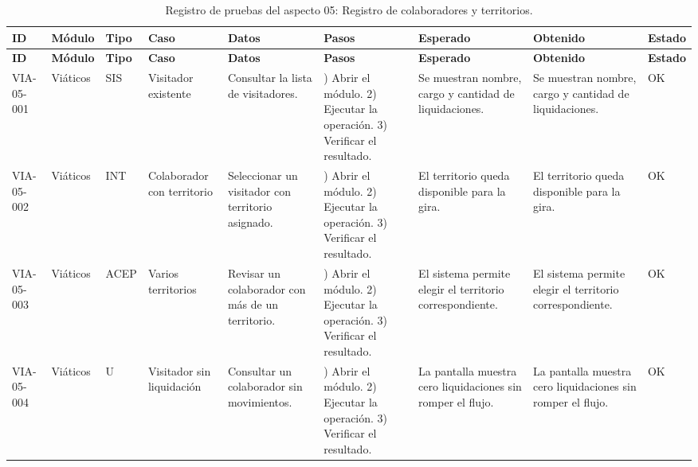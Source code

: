\begingroup\fontsize{8}{10}\selectfont\renewcommand{\arraystretch}{1.25}\setlength{\tabcolsep}{2pt}
\begin{xltabular}{\linewidth}{@{}
>{\raggedright\arraybackslash}p{1.35cm}
>{\raggedright\arraybackslash}p{1.25cm}
>{\centering\arraybackslash}p{0.90cm}
>{\raggedright\arraybackslash}p{1.75cm}
>{\raggedright\arraybackslash}p{1.90cm}
>{\raggedright\arraybackslash}p{2.10cm}
>{\raggedright\arraybackslash}p{2.05cm}
>{\raggedright\arraybackslash}p{2.05cm}
>{\centering\arraybackslash}p{0.95cm}
@{}}

\caption{Registro de pruebas del aspecto 05: Registro de colaboradores y territorios.}\label{tab:cap4_aspecto_via_05}\\
\toprule
\textbf{ID} & \textbf{Módulo} & \textbf{Tipo} & \textbf{Caso} & \textbf{Datos} & \textbf{Pasos} & \textbf{Esperado} & \textbf{Obtenido} & \textbf{Estado}\\
\midrule
\endfirsthead
\toprule
\textbf{ID} & \textbf{Módulo} & \textbf{Tipo} & \textbf{Caso} & \textbf{Datos} & \textbf{Pasos} & \textbf{Esperado} & \textbf{Obtenido} & \textbf{Estado}\\
\midrule
\endhead
\endfoot
\bottomrule
\endlastfoot
VIA-05-001 & Viáticos & SIS & Visitador existente & Consultar la lista de visitadores. & 1) Abrir el módulo. 2) Ejecutar la operación. 3) Verificar el resultado. & Se muestran nombre, cargo y cantidad de liquidaciones. & Se muestran nombre, cargo y cantidad de liquidaciones. & OK\\
\addlinespace
VIA-05-002 & Viáticos & INT & Colaborador con territorio & Seleccionar un visitador con territorio asignado. & 1) Abrir el módulo. 2) Ejecutar la operación. 3) Verificar el resultado. & El territorio queda disponible para la gira. & El territorio queda disponible para la gira. & OK\\
\addlinespace
VIA-05-003 & Viáticos & ACEP & Varios territorios & Revisar un colaborador con más de un territorio. & 1) Abrir el módulo. 2) Ejecutar la operación. 3) Verificar el resultado. & El sistema permite elegir el territorio correspondiente. & El sistema permite elegir el territorio correspondiente. & OK\\
\addlinespace
VIA-05-004 & Viáticos & U & Visitador sin liquidación & Consultar un colaborador sin movimientos. & 1) Abrir el módulo. 2) Ejecutar la operación. 3) Verificar el resultado. & La pantalla muestra cero liquidaciones sin romper el flujo. & La pantalla muestra cero liquidaciones sin romper el flujo. & OK\\

\end{xltabular}
